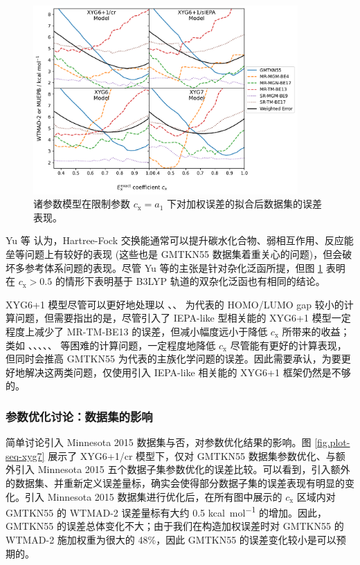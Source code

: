 \begin{figure}[h]
  \centering
  \caption{诸参数模型在限制参数 $c_\mathrm{x} = a_1$ 下对加权误差的拟合后数据集的误差表现。}
  \label{fig.plot-seq}
  \includegraphics[width=0.9\textwidth]{assets/plot-seq.pdf}
\end{figure}

Yu 等\cite{Yu-Truhlar.CS.2016} 认为，Hartree-Fock 交换能通常可以提升碳水化合物、弱相互作用、反应能垒等问题上有较好的表现 (这些也是 GMTKN55 数据集着重关心的问题)，但会破坏多参考体系问题的表现。尽管 Yu 等的主张是针对杂化泛函所提，但图 \ref{fig.plot-seq} 表明在 $c_\mathrm{x} > 0.5$ 的情形下表明基于 B3LYP 轨道的双杂化泛函也有相同的结论。

XYG6+1 模型尽管可以更好地处理以 、、 为代表的 HOMO/LUMO gap 较小的计算问题，但需要指出的是，尽管引入了 IEPA-like 型相关能的 XYG6+1 模型一定程度上减少了 MR-TM-BE13 的误差，但减小幅度远小于降低 $c_\mathrm{x}$ 所带来的收益；类如 、、、、、 等困难的计算问题，一定程度地降低 $c_\mathrm{x}$ 尽管能有更好的计算表现，但同时会推高 GMTKN55 为代表的主族化学问题的误差。因此需要承认，为要更好地解决这两类问题，仅使用引入 IEPA-like 相关能的 XYG6+1 框架仍然是不够的。

\subsubsection{参数优化讨论：数据集的影响}

简单讨论引入 Minnesota 2015 数据集与否，对参数优化结果的影响。图 \ref{fig.plot-seq-xyg7} 展示了 XYG6+1/cr 模型下，仅对 GMTKN55 数据集参数优化、与额外引入 Minnesota 2015 五个数据子集参数优化的误差比较。可以看到，引入额外的数据集、并重新定义误差量标，确实会使得部分数据子集的误差表现有明显的变化。引入 Minnesota 2015 数据集进行优化后，在所有图中展示的 $c_\mathrm{x}$ 区域内对 GMTKN55 的 WTMAD-2 误差量标有大约 0.5 \si{kcal.mol^{-1}} 的增加。因此，GMTKN55 的误差总体变化不大；由于我们在构造加权误差时对 GMTKN55 的 WTMAD-2 施加权重为很大的 48\%，因此 GMTKN55 的误差变化较小是可以预期的。

